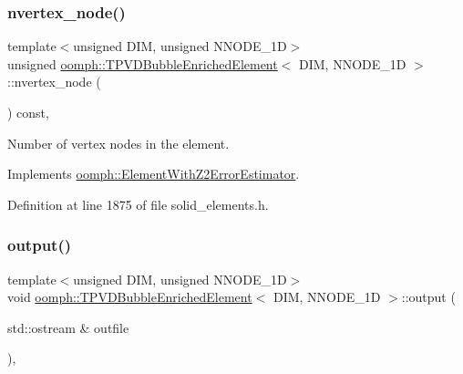 \subsubsection{\texorpdfstring{nvertex\+\_\+node()}{nvertex\_node()}}
{\footnotesize\ttfamily template$<$unsigned D\+IM, unsigned N\+N\+O\+D\+E\+\_\+1D$>$ \\
unsigned \hyperlink{classoomph_1_1TPVDBubbleEnrichedElement}{oomph\+::\+T\+P\+V\+D\+Bubble\+Enriched\+Element}$<$ D\+IM, N\+N\+O\+D\+E\+\_\+1D $>$\+::nvertex\+\_\+node (\begin{DoxyParamCaption}{ }\end{DoxyParamCaption}) const\hspace{0.3cm}{\ttfamily [inline]}, {\ttfamily [virtual]}}



Number of vertex nodes in the element. 



Implements \hyperlink{classoomph_1_1ElementWithZ2ErrorEstimator_a19495a0e77ef4ff35f15fdf7913b4077}{oomph\+::\+Element\+With\+Z2\+Error\+Estimator}.



Definition at line 1875 of file solid\+\_\+elements.\+h.

\mbox{\label{classoomph_1_1TPVDBubbleEnrichedElement_a4b2c44ad460959d1c3862eec3b879573}} 
\subsubsection{\texorpdfstring{output()}{output()}\hspace{0.1cm}{\footnotesize\ttfamily [1/4]}}
{\footnotesize\ttfamily template$<$unsigned D\+IM, unsigned N\+N\+O\+D\+E\+\_\+1D$>$ \\
void \hyperlink{classoomph_1_1TPVDBubbleEnrichedElement}{oomph\+::\+T\+P\+V\+D\+Bubble\+Enriched\+Element}$<$ D\+IM, N\+N\+O\+D\+E\+\_\+1D $>$\+::output (\begin{DoxyParamCaption}\item[{std\+::ostream \&}]{outfile }\end{DoxyParamCaption})\hspace{0.3cm}{\ttfamily [inline]}, {\ttfamily [virtual]}}



